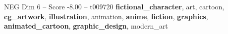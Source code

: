 \begin{textsample}{NEG Dim 6 – Score -8.00 – t009720}  \label{ex:f6_neg_036}
\textbf{fictional\_character}, art, cartoon, \textbf{cg\_artwork}, \textbf{illustration}, animation, \textbf{anime}, \textbf{fiction}, \textbf{graphics}, \textbf{animated\_cartoon}, \textbf{graphic\_design}, modern\_art

\end{textsample}
